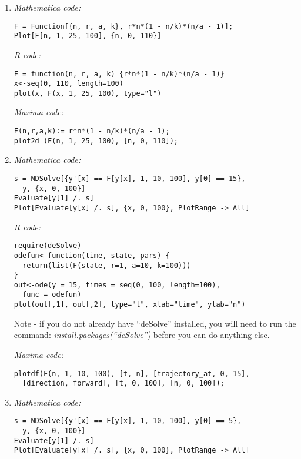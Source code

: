 \documentclass[12pt]{article}
\begin{document}
\begin{enumerate}[label=\alph*]
\item{}
\textit{Mathematica code:}
\lstset{language=Mathematica, basicstyle=\footnotesize} 
\begin{lstlisting}[frame=single]
F = Function[{n, r, a, k}, r*n*(1 - n/k)*(n/a - 1)];
Plot[F[n, 1, 25, 100], {n, 0, 110}]
\end{lstlisting}

\textit{R code:}
\lstset{language=R, basicstyle=\footnotesize} 
\begin{lstlisting}[frame=single]
F = function(n, r, a, k) {r*n*(1 - n/k)*(n/a - 1)}
x<-seq(0, 110, length=100)
plot(x, F(x, 1, 25, 100), type="l")
\end{lstlisting}

\textit{Maxima code:}
\lstset{language=Maxima, basicstyle=\footnotesize} 
\begin{lstlisting}[frame=single]
F(n,r,a,k):= r*n*(1 - n/k)*(n/a - 1);
plot2d (F(n, 1, 25, 100), [n, 0, 110]);
\end{lstlisting}

\item{}
\textit{Mathematica code:}
\lstset{language=Mathematica, basicstyle=\footnotesize} 
\begin{lstlisting}[frame=single]
s = NDSolve[{y'[x] == F[y[x], 1, 10, 100], y[0] == 15},
  y, {x, 0, 100}]
Evaluate[y[1] /. s]
Plot[Evaluate[y[x] /. s], {x, 0, 100}, PlotRange -> All]
\end{lstlisting}

\textit{R code:}
\lstset{language=R, basicstyle=\footnotesize} 
\begin{lstlisting}[frame=single]
require(deSolve)
odefun<-function(time, state, pars) {
  return(list(F(state, r=1, a=10, k=100)))
}
out<-ode(y = 15, times = seq(0, 100, length=100),
  func = odefun)
plot(out[,1], out[,2], type="l", xlab="time", ylab="n")
\end{lstlisting}
Note - if you do not already have ``deSolve'' installed, you will need to run the command: \textit{install.packages(``deSolve'')} before you can do anything else.

\textit{Maxima code:}
\lstset{language=Maxima, basicstyle=\footnotesize} 
\begin{lstlisting}[frame=single]
plotdf(F(n, 1, 10, 100), [t, n], [trajectory_at, 0, 15],
  [direction, forward], [t, 0, 100], [n, 0, 100]);
\end{lstlisting}

\item{}
\textit{Mathematica code:}
\lstset{language=Mathematica, basicstyle=\footnotesize} 
\begin{lstlisting}[frame=single]
s = NDSolve[{y'[x] == F[y[x], 1, 10, 100], y[0] == 5},
  y, {x, 0, 100}]
Evaluate[y[1] /. s]
Plot[Evaluate[y[x] /. s], {x, 0, 100}, PlotRange -> All]
\end{lstlisting}


\end{enumerate}
\end{document}
